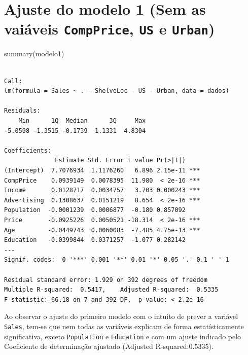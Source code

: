 \documentclass[
  letterpaper,
  DIV=11,
  numbers=noendperiod]{scrartcl}
\newenvironment{Shaded}{\begin{snugshade}}{\end{snugshade}}
\newcommand{\FunctionTok}[1]{\textcolor[rgb]{0.28,0.35,0.67}{#1}}
\newcommand{\NormalTok}[1]{\textcolor[rgb]{0.00,0.23,0.31}{#1}}
\begin{document}
\hfill\break

\section{\texorpdfstring{Ajuste do modelo 1 (Sem as vaiáveis
\texttt{CompPrice}, \texttt{US} e
\texttt{Urban})}{Ajuste do modelo 1 (Sem as vaiáveis CompPrice, US e Urban)}}\label{ajuste-do-modelo-1-sem-as-vaiuxe1veis-compprice-us-e-urban}

\begin{Shaded}
\begin{Highlighting}[]
\FunctionTok{summary}\NormalTok{(modelo1)}
\end{Highlighting}
\end{Shaded}

\begin{verbatim}

Call:
lm(formula = Sales ~ . - ShelveLoc - US - Urban, data = dados)

Residuals:
    Min      1Q  Median      3Q     Max 
-5.0598 -1.3515 -0.1739  1.1331  4.8304 

Coefficients:
              Estimate Std. Error t value Pr(>|t|)    
(Intercept)  7.7076934  1.1176260   6.896 2.15e-11 ***
CompPrice    0.0939149  0.0078395  11.980  < 2e-16 ***
Income       0.0128717  0.0034757   3.703 0.000243 ***
Advertising  0.1308637  0.0151219   8.654  < 2e-16 ***
Population  -0.0001239  0.0006877  -0.180 0.857092    
Price       -0.0925226  0.0050521 -18.314  < 2e-16 ***
Age         -0.0449743  0.0060083  -7.485 4.75e-13 ***
Education   -0.0399844  0.0371257  -1.077 0.282142    
---
Signif. codes:  0 '***' 0.001 '**' 0.01 '*' 0.05 '.' 0.1 ' ' 1

Residual standard error: 1.929 on 392 degrees of freedom
Multiple R-squared:  0.5417,    Adjusted R-squared:  0.5335 
F-statistic: 66.18 on 7 and 392 DF,  p-value: < 2.2e-16
\end{verbatim}

Ao observar o ajuste do primeiro modelo com o intuito de prever a
variável \texttt{Sales}, tem-se que nem todas as variáveis explicam de
forma estatísticamente significativa, exceto \texttt{Population} e
\texttt{Education} e com um ajuste indicado pelo Coeficiente de
determinação ajustado (Adjusted R-squared:0.5335).

\hfill\break
\end{document}
